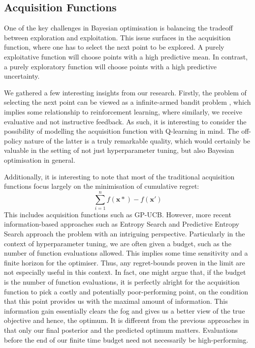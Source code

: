 \documentclass[letterpaper]{article}
\begin{document}
\subsection{Acquisition Functions}
One of the key challenges in Bayesian optimisation is balancing the tradeoff
between exploration and exploitation. This issue surfaces in the acquisition function,
where one has to select the next point to be explored. A purely exploitative function
will choose points with a high predictive mean. In contrast, a purely exploratory
function will choose points with a high predictive uncertainty.

We gathered a few interesting insights from our research.
Firstly, the problem of selecting the next point can be viewed as a infinite-armed
bandit problem \cite{hoffman2011portfolio}, which implies some relationship to
reinforcement learning, where similarly, we receive evaluative and not instructive
feedback. As such, it is interesting to consider the possibility of modelling the
acquisition function with Q-learning in mind. The off-policy nature of the latter is
a truly remarkable quality, which would certainly be valuable in the setting of not
just hyperparameter tuning, but also Bayesian optimisation in general.

Additionally, it is interesting to note that most of the traditional acquisition
functions focus largely on the minimisation of cumulative regret:
$$\sum_{i=1}^{n} f(\textbf{x}*) - f(\textbf{x}')$$
This includes acquisition functions such as GP-UCB. However, more recent
information-based approaches such as Entropy Search \cite{hennig2012entropy} and
Predictive Entropy Search approach the problem with an intriguing perspective.
Particularly in the context of hyperparameter tuning, we are often given a budget,
such as the number of function evaluations allowed. This implies some time sensitivity
and a finite horizon for the optimiser. Thus, any regret-bounds proven in the limit
are not especially useful in this context. In fact, one might argue that, if the
budget is the number of function evaluations, it is perfectly alright for the
acquisition function to pick a costly and potentially poor-performing point,
on the condition that this point provides us with the maximal amount of information.
This information gain essentially clears the fog and gives us a better view of the
true objective and hence, the optimum. It is different from the previous approaches
in that only our final posterior and the predicted optimum matters. Evaluations
before the end of our finite time budget need not necessarily be high-performing.
\end{document}
